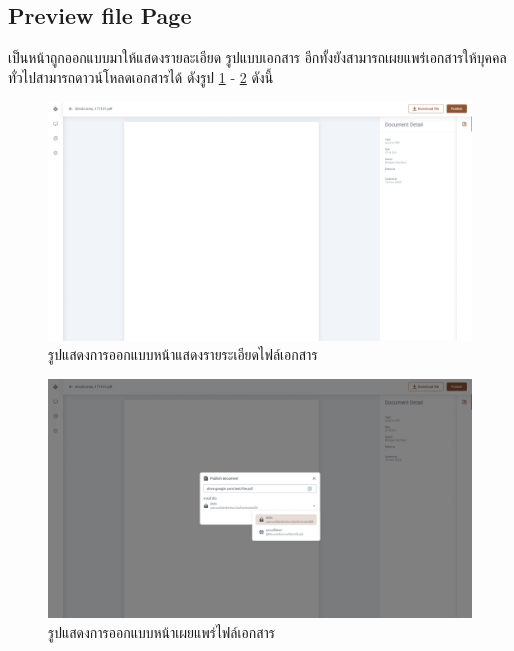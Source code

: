 \documentclass[12pt,oneside,openright,a4paper]{cpe-thai-project}
\begin{document}
\subsection{Preview file Page}
\hspace*{1cm} เป็นหน้าถูกออกแบบมาให้แสดงรายละเอียด รูปแบบเอกสาร อีกทั้งยังสามารถเผยแพร่เอกสารให้บุคคลทั่วไปสามารถดาวน์โหลดเอกสารได้ ดังรูป \ref{fig:preview-file} - \ref{fig:public-document} ดังนี้
\begin{figure}[!h]\centering
  \includegraphics[width=16cm]{./assets/userinterface/preview-file.png}
  \caption{รูปแสดงการออกแบบหน้าแสดงรายระเอียดไฟล์เอกสาร}\label{fig:preview-file}
\end{figure}

\begin{figure}[!h]\centering
  \includegraphics[width=16cm]{./assets/userinterface/public-document.png}
  \caption{รูปแสดงการออกแบบหน้าเผยแพร่ไฟล์เอกสาร}\label{fig:public-document}
\end{figure}

\newpage
\end{document}
